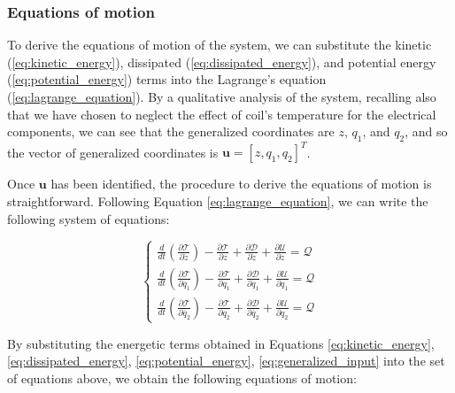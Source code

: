 \subsubsection{Equations of motion}
\label{subsubsec:equations_of_motion}

To derive the equations of motion of the system, we can substitute the kinetic (\ref{eq:kinetic_energy}), dissipated (\ref{eq:dissipated_energy}), and potential energy (\ref{eq:potential_energy}) terms into the Lagrange's equation (\ref{eq:lagrange_equation}).
By a qualitative analysis of the system, recalling also that we have chosen to neglect the effect of coil's temperature for the electrical components, we can see that the generalized coordinates are $z$, $q_1$, and $q_2$, and so the vector of generalized coordinates is $\mathbf{u} = [z, q_1, q_2]^T$.

Once $\mathbf{u}$ has been identified, the procedure to derive the equations of motion is straightforward.
Following Equation \ref{eq:lagrange_equation}, we can write the following system of equations:

\begin{equation}
    \begin{cases}
        \frac{d}{dt} \left( \frac{\partial \mathcal{T}}{\partial \dot{z}} \right) - \frac{\partial \mathcal{T}}{\partial z} + \frac{\partial \mathcal{D}}{\partial \dot{z}} + \frac{\partial \mathcal{U}}{\partial z} = \mathcal{Q}         \\
        \frac{d}{dt} \left( \frac{\partial \mathcal{T}}{\partial \dot{q_1}} \right) - \frac{\partial \mathcal{T}}{\partial q_1} + \frac{\partial \mathcal{D}}{\partial \dot{q_1}} + \frac{\partial \mathcal{U}}{\partial q_1} = \mathcal{Q} \\
        \frac{d}{dt} \left( \frac{\partial \mathcal{T}}{\partial \dot{q_2}} \right) - \frac{\partial \mathcal{T}}{\partial q_2} + \frac{\partial \mathcal{D}}{\partial \dot{q_2}} + \frac{\partial \mathcal{U}}{\partial q_2} = \mathcal{Q}
    \end{cases}
\end{equation}

By substituting the energetic terms obtained in Equations \ref{eq:kinetic_energy}, \ref{eq:dissipated_energy}, \ref{eq:potential_energy}, \ref{eq:generalized_input} into the set of equations above, we obtain the following equations of motion:

